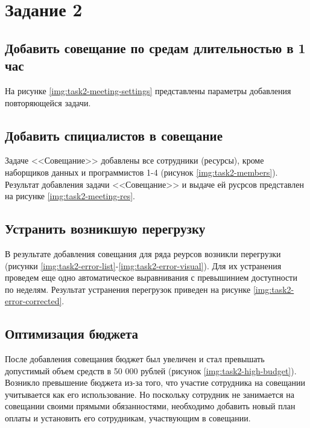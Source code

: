 \section{Задание 2}

\subsection{Добавить совещание по средам длительностью в 1 час}

На рисунке \ref{img:task2-meeting-settings} представлены параметры добавления повторяющейся задачи. 



\subsection{Добавить спициалистов в совещание}

Задаче <<Совещание>> добавлены все сотрудники (ресурсы), кроме наборщиков данных и программистов 1-4 (рисунок \ref{img:task2-members}). Результат добавления задачи <<Совещание>> и выдаче ей русрсов представлен на рисунке \ref{img:task2-meeting-res}.



\subsection{Устранить возникшую перегрузку}

В результате добавления совещания для ряда реурсов возникли перегрузки (рисунки \ref{img:task2-error-list}-\ref{img:task2-error-visual}). Для их устранения проведем еще одно автоматическое выравнивания с превышинием доступности по неделям. Результат устранения перегрузок приведен на рисунке \ref{img:task2-error-corrected}.



\subsection{Оптимизация бюджета}

После добавления совещания бюджет был увеличен и стал превышать допустимый объем средств в 50 000 рублей (рисунок \ref{img:task2-high-budget}). Возникло превышение бюджета из-за того, что участие сотрудника на совещании учитывается как его использование. Но поскольку сотрудник не занимается на совещании своими прямыми обязанностями, необходимо добавить новый план оплаты и установить его сотрудникам, участвующим в совещании. 

